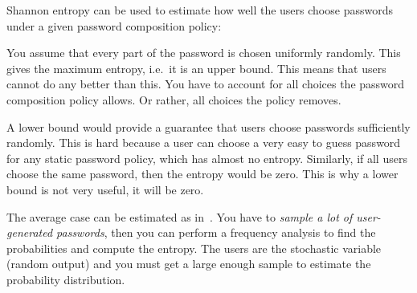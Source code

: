   
\question[3]
  Shannon entropy can be used to estimate how well the users choose passwords 
  under a given password composition policy:

  \begin{solution}
    You assume that every part of the password is chosen uniformly randomly.
    This gives the maximum entropy, i.e.~it is an upper bound.
    This means that users cannot do any better than this.
    You have to account for all choices the password composition policy allows.
    Or rather, all choices the policy removes.

    A lower bound would provide a guarantee that users choose passwords 
    sufficiently randomly.
    This is hard because a user can choose a very easy to guess password for 
    any static password policy, which has almost no entropy.
    Similarly, if all users choose the same password, then the entropy would be 
    zero.
    This is why a lower bound is not very useful, it will be zero.

    The average case can be estimated as in~\cite{Komanduri2011opa}.
    You have to \emph{sample a lot of user-generated passwords}, then you can 
    perform a frequency analysis to find the probabilities and compute the 
    entropy.
    The users are the stochastic variable (random output) and you must get 
    a large enough sample to estimate the probability distribution.
  \end{solution}


  
